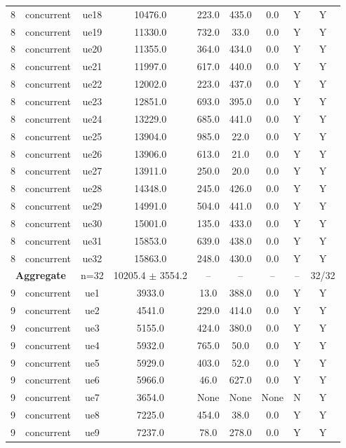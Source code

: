 \begin{table}[ht]
\begin{tabular}{|c|c|c|c|c|c|c|c|c|}
8 & concurrent & ue18 & 10476.0 & 223.0 & 435.0 & 0.0 & Y & Y \\
8 & concurrent & ue19 & 11330.0 & 732.0 & 33.0 & 0.0 & Y & Y \\
8 & concurrent & ue20 & 11355.0 & 364.0 & 434.0 & 0.0 & Y & Y \\
8 & concurrent & ue21 & 11997.0 & 617.0 & 440.0 & 0.0 & Y & Y \\
8 & concurrent & ue22 & 12002.0 & 223.0 & 437.0 & 0.0 & Y & Y \\
8 & concurrent & ue23 & 12851.0 & 693.0 & 395.0 & 0.0 & Y & Y \\
8 & concurrent & ue24 & 13229.0 & 685.0 & 441.0 & 0.0 & Y & Y \\
8 & concurrent & ue25 & 13904.0 & 985.0 & 22.0 & 0.0 & Y & Y \\
8 & concurrent & ue26 & 13906.0 & 613.0 & 21.0 & 0.0 & Y & Y \\
8 & concurrent & ue27 & 13911.0 & 250.0 & 20.0 & 0.0 & Y & Y \\
8 & concurrent & ue28 & 14348.0 & 245.0 & 426.0 & 0.0 & Y & Y \\
8 & concurrent & ue29 & 14991.0 & 504.0 & 441.0 & 0.0 & Y & Y \\
8 & concurrent & ue30 & 15001.0 & 135.0 & 433.0 & 0.0 & Y & Y \\
8 & concurrent & ue31 & 15853.0 & 639.0 & 438.0 & 0.0 & Y & Y \\
8 & concurrent & ue32 & 15863.0 & 248.0 & 430.0 & 0.0 & Y & Y \\
\multicolumn{2}{|c|}{\textbf{Aggregate}} & n=32 & 10205.4 $\pm$ 3554.2 & -- & -- & -- & -- & 32/32 \\
\hline
9 & concurrent & ue1 & 3933.0 & 13.0 & 388.0 & 0.0 & Y & Y \\
9 & concurrent & ue2 & 4541.0 & 229.0 & 414.0 & 0.0 & Y & Y \\
9 & concurrent & ue3 & 5155.0 & 424.0 & 380.0 & 0.0 & Y & Y \\
9 & concurrent & ue4 & 5932.0 & 765.0 & 50.0 & 0.0 & Y & Y \\
9 & concurrent & ue5 & 5929.0 & 403.0 & 52.0 & 0.0 & Y & Y \\
9 & concurrent & ue6 & 5966.0 & 46.0 & 627.0 & 0.0 & Y & Y \\
9 & concurrent & ue7 & 3654.0 & None & None & None & N & Y \\
9 & concurrent & ue8 & 7225.0 & 454.0 & 38.0 & 0.0 & Y & Y \\
9 & concurrent & ue9 & 7237.0 & 78.0 & 278.0 & 0.0 & Y & Y \\

\end{tabular}
\end{table}
